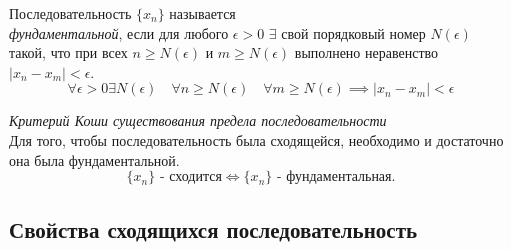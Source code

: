 \begin{definition}
  Последовательность $\{x_{n}\} $ называется \\ \textit{фундаментальной}, если для любого $\epsilon > 0$ $\exists $ свой порядковый номер $N(\epsilon)$ такой, что при всех $n \ge N(\epsilon)$ и $m \ge  N(\epsilon)$ выполнено неравенство $|x_{n} - x_{m}| < \epsilon$.
  \[
    \forall \epsilon > 0 \exists N(\epsilon) 
    \quad \forall n \ge N(\epsilon)
    \quad \forall m \ge N(\epsilon) 
    \implies |x_{n} - x_{m}| < \epsilon
  \]
\end{definition}

\begin{theorem}
  \textit{Критерий Коши существования предела последовательности} \\
  Для того, чтобы последовательность была сходящейся, необходимо и достаточно она была фундаментальной.
  \[
    \{x_{n}\} \text{ - сходится} \iff \{x_{n}\} \text{ - фундаментальная}
  .\] 
\end{theorem}

\subsection{Свойства сходящихся последовательность}

